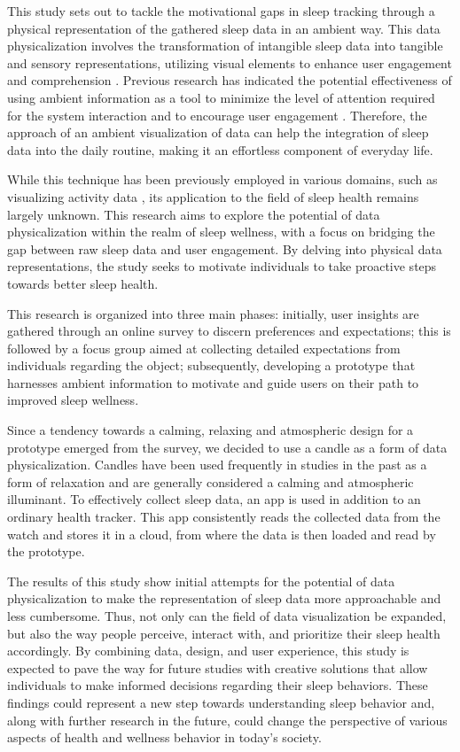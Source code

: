 \documentclass[
  a4paper,  %
  twoside,  %
  bibliography=totoc,
  headsepline,
  cleardoublepage=empty,
  parskip=half,
  draft=false
]{scrbook}
\begin{document}
This study sets out to tackle the motivational gaps in sleep tracking through a physical representation of the gathered sleep data in an ambient way. This data physicalization involves the transformation of intangible sleep data into tangible and sensory representations, utilizing visual elements to enhance user engagement and comprehension \cite{Oppotunieites_Challenges_DataPhysicalization}. Previous research has indicated the potential effectiveness of using ambient information as a tool to minimize the level of attention required for the system interaction and to encourage user engagement \cite{Fostering_Engagement, Econundrum, Roam-IO}.
Therefore, the approach of an ambient visualization of data can help the integration of sleep data into the daily routine, making it an effortless component of everyday life.

While this technique has been previously employed in various domains, such as visualizing activity data \cite{LOOP, Shelfie, 10_Design_Themes, TastyBeats, Activity_Scupltures}, its application to the field of sleep health remains largely unknown. This research aims to explore the potential of data physicalization within the realm of sleep wellness, with a focus on bridging the gap between raw sleep data and user engagement. By delving into physical data representations, the study seeks to motivate individuals to take proactive steps towards better sleep health.

This research is organized into three main phases: initially, user insights are gathered through an online survey to discern preferences and expectations; this is followed by a focus group aimed at collecting detailed expectations from individuals regarding the object; subsequently, developing a prototype that harnesses ambient information to motivate and guide users on their path to improved sleep wellness.

Since a tendency towards a calming, relaxing and atmospheric design for a prototype emerged from the survey, we decided to use a candle as a form of data physicalization. Candles have been used frequently in studies in the past as a form of relaxation \cite{Candle_as_relaxation, Candle_reduce_stress} and are generally considered a calming and atmospheric illuminant. To effectively collect sleep data, an app is used in addition to an ordinary health tracker. This app consistently reads the collected data from the watch and stores it in a cloud, from where the data is then loaded and read by the prototype.

The results of this study show initial attempts for the potential of data physicalization to make the representation of sleep data more approachable and less cumbersome. Thus, not only can the field of data visualization be expanded, but also the way people perceive, interact with, and prioritize their sleep health accordingly. By combining data, design, and user experience, this study is expected to pave the way for future studies with creative solutions that allow individuals to make informed decisions regarding their sleep behaviors. These findings could represent a new step towards understanding sleep behavior and, along with further research in the future, could change the perspective of various aspects of health and wellness behavior in today's society.
\end{document}
